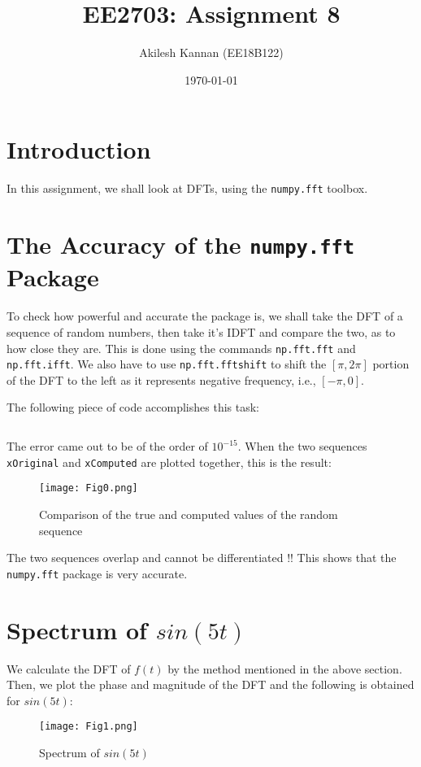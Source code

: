 \documentclass[11pt, a4paper, twoside]{article}
\title{EE2703: Assignment 8}
\author{Akilesh Kannan (EE18B122)}
\date{\today}
\begin{document}
\maketitle

\section{Introduction}
In this assignment, we shall look at DFTs, using the \texttt{numpy.fft} toolbox.

\section{The Accuracy of the \texttt{numpy.fft} Package}
    To check how powerful and accurate the package is, we shall take the DFT of a sequence of random numbers, then take it's IDFT and compare the two, as to how close they are. This is done using the commands \texttt{np.fft.fft} and \texttt{np.fft.ifft}. We also have to use \texttt{np.fft.fftshift} to shift the $[\pi, 2\pi]$ portion of the DFT to the left as it represents negative frequency, i.e., $[-\pi, 0]$.
    
    The following piece of code accomplishes this task:
    \inputminted[breaklines, linenos]{python}{Code/1.py}
    
    The error came out to be of the order of $10^{-15}$. When the two sequences \texttt{xOriginal} and \texttt{xComputed} are plotted together, this is the result:
    
    \begin{figure}[H]
        \centering
        \texttt{[image: Fig0.png]}
        \caption{Comparison of the true and computed values of the random sequence}
        \label{fig:fftRandom}
    \end{figure}
    
    The two sequences overlap and cannot be differentiated !! This shows that the \texttt{numpy.fft} package is very accurate.

\section{Spectrum of $sin(5t)$}
    We calculate the DFT of $f(t)$ by the method mentioned in the above section. Then, we plot the phase and magnitude of the DFT and the following is obtained for $sin(5t)$:
    \begin{figure}[H]
        \centering
        \texttt{[image: Fig1.png]}
        \caption{Spectrum of $sin(5t)$}
        \label{fig:sin5t}
    \end{figure}
    
\end{document}
